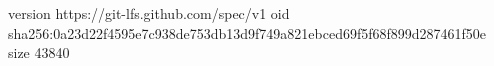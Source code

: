 version https://git-lfs.github.com/spec/v1
oid sha256:0a23d22f4595e7c938de753db13d9f749a821ebced69f5f68f899d287461f50e
size 43840
